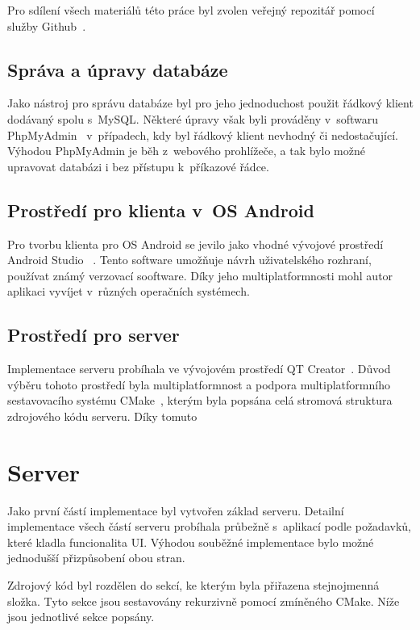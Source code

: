 \documentclass[thesis=B,czech]{FITthesis}[2013/10/20]
\begin{document}
Pro sdílení všech materiálů této práce byl zvolen veřejný repozitář pomocí~\cite{repo} služby Github~\cite{github}.

\subsection{Správa a úpravy databáze}

Jako nástroj pro správu databáze byl pro jeho jednoduchost použit řádkový klient dodávaný spolu s~MySQL. Některé úpravy však byli prováděny v~softwaru PhpMyAdmin~\cite{phpmyadmin} v~případech, kdy byl řádkový klient nevhodný či nedostačující. Výhodou PhpMyAdmin je běh z~webového prohlížeče, a tak bylo možné upravovat databázi i bez přístupu k~příkazové řádce.

\subsection{Prostředí pro klienta v~OS Android}

Pro tvorbu klienta pro OS Android se jevilo jako vhodné vývojové prostředí Android Studio ~\cite{android_studio}. Tento software umožňuje návrh uživatelského rozhraní, používat známý verzovací sooftware. Díky jeho multiplatformnosti mohl autor aplikaci vyvíjet v~různých operačních systémech.

\subsection{Prostředí pro server}

Implementace serveru probíhala ve vývojovém prostředí QT Creator~\cite{qtcreator}. Důvod výběru tohoto prostředí byla multiplatformnost a podpora multiplatformního sestavovacího systému CMake~\cite{cmake}, kterým byla popsána celá stromová struktura zdrojového kódu serveru. Díky tomuto 

\section{Server}

Jako první částí implementace byl vytvořen základ serveru. Detailní implementace všech částí serveru probíhala průbežně s~aplikací podle požadavků, které kladla funcionalita UI. Výhodou souběžné implementace bylo možné jednodušší přizpůsobení obou stran.

Zdrojový kód byl rozdělen do sekcí, ke kterým byla přiřazena stejnojmenná složka. Tyto sekce jsou sestavovány rekurzivně pomocí zmíněného CMake. Níže jsou jednotlivé sekce popsány. 
\end{document}
